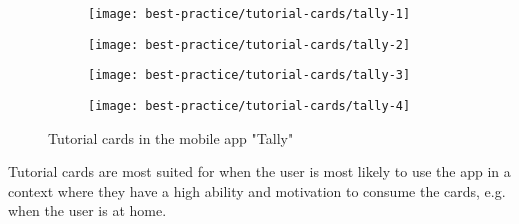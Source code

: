 \begin{figure}[ht]
\begin{subfigure}{.25\textwidth}
  \centering
  \texttt{[image: best-practice/tutorial-cards/tally-1]}
  \label{subfig:best-practice/tutorial-cards/tally-1}
\end{subfigure}%
\begin{subfigure}{.25\textwidth}
  \centering
  \texttt{[image: best-practice/tutorial-cards/tally-2]}
  \label{subfig:best-practice/tutorial-cards/tally-2}
\end{subfigure}%
\begin{subfigure}{.25\textwidth}
  \centering
  \texttt{[image: best-practice/tutorial-cards/tally-3]}
  \label{subfig:best-practice/tutorial-cards/tally-3}
\end{subfigure}%
\begin{subfigure}{.25\textwidth}
  \centering
  \texttt{[image: best-practice/tutorial-cards/tally-4]}
  \label{subfig:best-practice/tutorial-cards/tally-4}
\end{subfigure}%
\caption{Tutorial cards in the mobile app "Tally"}
\label{fig:general-overview}
\end{figure}

Tutorial cards are most suited for when the user is most likely to use the app in a context where they have a high ability and motivation to consume the cards, e.g. when the user is at home.

